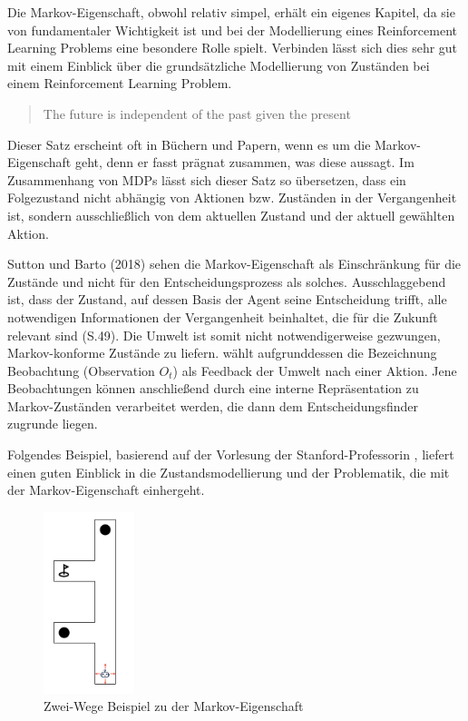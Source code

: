 Die Markov-Eigenschaft, obwohl relativ simpel, erhält ein eigenes Kapitel, da sie von fundamentaler Wichtigkeit ist und bei der Modellierung eines Reinforcement Learning Problems eine besondere Rolle spielt. Verbinden lässt sich dies sehr gut mit einem Einblick über die grundsätzliche Modellierung von Zuständen bei einem Reinforcement Learning Problem.

\begin{quote}
    The future is independent of the past given the present
  \end{quote}

Dieser Satz erscheint oft in Büchern und Papern, wenn es um die Markov-Eigenschaft geht, denn er fasst prägnat zusammen, was diese aussagt. Im Zusammenhang von MDPs lässt sich dieser Satz so übersetzen, dass ein Folgezustand nicht abhängig von Aktionen bzw. Zuständen in der Vergangenheit ist, sondern ausschließlich von dem aktuellen Zustand und der aktuell gewählten Aktion.
\par 
Sutton und Barto (2018) sehen die Markov-Eigenschaft als Einschränkung für die Zustände und nicht für den Entscheidungsprozess als solches. 
Ausschlaggebend ist, dass der Zustand, auf dessen Basis der Agent seine Entscheidung trifft, alle notwendigen Informationen der Vergangenheit beinhaltet, die für die Zukunft relevant sind (S.49).
Die Umwelt ist somit nicht notwendigerweise gezwungen, Markov-konforme Zustände zu liefern. \cite{Brunskill} wählt aufgrunddessen die Bezeichnung \glqq Beobachtung\grqq{} (Observation $O_t$) als Feedback der Umwelt nach einer Aktion. Jene Beobachtungen können anschließend durch eine interne Repräsentation zu Markov-Zuständen verarbeitet werden, die dann dem Entscheidungsfinder zugrunde liegen.
\par
Folgendes Beispiel, basierend auf der Vorlesung der Stanford-Professorin \cite{Brunskill}, liefert einen guten Einblick in die Zustandsmodellierung und der Problematik, die mit der Markov-Eigenschaft einhergeht.
\par 
\begin{figure}[H]
  \centering
  \includegraphics[height=200px]{images/2passagesDefault.png}
  \caption{ Zwei-Wege Beispiel zu der Markov-Eigenschaft}
  \label{fig:2-Wege-1}
\end{figure}

